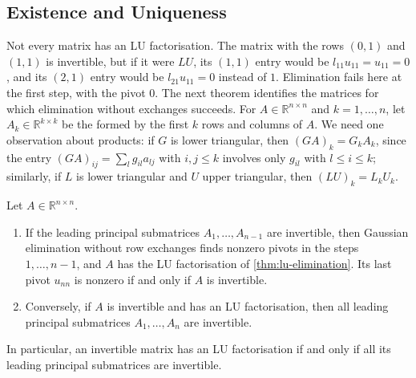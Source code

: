 \subsection{Existence and Uniqueness}

Not every matrix has an LU factorisation. The matrix with the rows $(0,1)$ and $(1,1)$ is invertible, but if it were $LU$, its $(1,1)$ entry would be $l_{11}u_{11}=u_{11}=0$, and its $(2,1)$ entry would be $l_{21}u_{11}=0$ instead of $1$. Elimination fails here at the first step, with the pivot $0$. The next theorem identifies the matrices for which elimination without exchanges succeeds. For $A\in\mathbb R^{n\times n}$ and $k=1,\ldots,n$, let $A_k\in\mathbb R^{k\times k}$ be the  formed by the first $k$ rows and columns of $A$. We need one observation about products: if $G$ is lower triangular, then $(GA)_k=G_kA_k$, since the entry $(GA)_{ij}=\sum_lg_{il}a_{lj}$ with $i,j\le k$ involves only $g_{il}$ with $l\le i\le k$; similarly, if $L$ is lower triangular and $U$ upper triangular, then $(LU)_k=L_kU_k$.

\begin{theorem}
\label{thm:lu-existence}
Let $A\in\mathbb R^{n\times n}$.
\begin{enumerate}
\item If the leading principal submatrices $A_1,\ldots,A_{n-1}$ are invertible, then Gaussian elimination without row exchanges finds nonzero pivots in the steps $1,\ldots,n-1$, and $A$ has the LU factorisation of \cref{thm:lu-elimination}. Its last pivot $u_{nn}$ is nonzero if and only if $A$ is invertible.
\item Conversely, if $A$ is invertible and has an LU factorisation, then all leading principal submatrices $A_1,\ldots,A_n$ are invertible.
\end{enumerate}
In particular, an invertible matrix has an LU factorisation if and only if all its leading principal submatrices are invertible.
\end{theorem}

